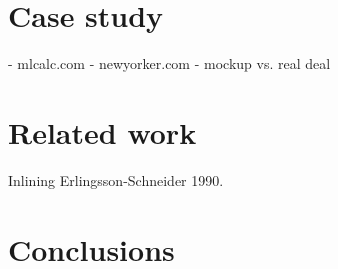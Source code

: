 \documentclass{llncs}
\begin{document}
\section{Case study}
\label{sec:case}

- mlcalc.com
- newyorker.com
- mockup vs. real deal

\section{Related work}
\label{sec:related}

Inlining Erlingsson-Schneider 1990.

\section{Conclusions}
\label{sec:conc}



\end{document}
